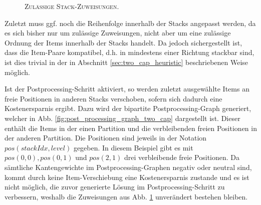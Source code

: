 \begin{figure}[H]
  \centering
    \caption{\textsc{Zulässige Stack-Zuweisungen.}}
    \label{fig:stacking_solution}
\end{figure}

Zuletzt muss ggf. noch die Reihenfolge innerhalb der Stacks angepasst werden, da es sich bisher nur um zulässige Zuweisungen,
nicht aber um eine zulässige Ordnung der Items innerhalb der Stacks handelt.
Da jedoch sichergestellt ist, dass die Item-Paare kompatibel, d.h. in mindestens einer Richtung stackbar sind,
ist dies trivial in der in Abschnitt \ref{sec:two_cap_heuristic} beschriebenen Weise möglich.

\pagebreak

Ist der Postprocessing-Schritt aktiviert, so werden zuletzt ausgewählte Items an freie Positionen in anderen Stacks
verschoben, sofern sich dadurch eine Kostenersparnis ergibt. Dazu wird der bipartite Postprocessing-Graph generiert, welcher in
Abb. \ref{fig:post_processing_graph_two_cap} dargestellt ist. Dieser enthält die Items in der einen Partition
und die verbleibenden freien Positionen in der anderen Partition. Die Positionen sind jeweils in der Notation
$pos(stackIdx, level)$ gegeben.
In diesem Beispiel gibt es mit $pos(0, 0), pos(0, 1)$ und $pos(2, 1)$ drei verbleibende freie Positionen.
Da sämtliche Kantengewichte im Postprocessing-Graphen negativ oder neutral sind, kommt durch keine Item-Verschiebung
eine Kostenersparnis zustande und es ist nicht möglich, die zuvor generierte Lösung im Postprocessing-Schritt zu
verbessern, weshalb die Zuweisungen aus Abb. \ref{fig:stacking_solution} unverändert bestehen bleiben.


